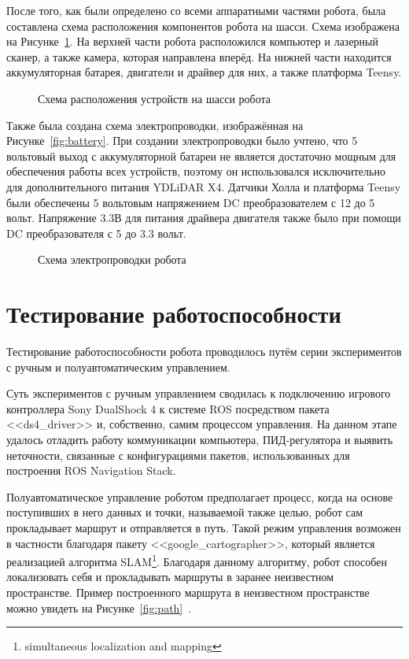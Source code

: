 После того, как были определено со всеми аппаратными частями робота, была составлена схема расположения компонентов робота на шасси. Схема изображена на Рисунке~\cref{fig:devices}. На верхней части робота расположился компьютер и лазерный сканер, а также камера, которая направлена вперёд. На нижней части находится аккумуляторная батарея, двигатели и драйвер для них, а также платформа Teensy.

\begin{figure}[ht]
    \caption{Схема расположения устройств на шасси робота}\label{fig:devices}
\end{figure}

Также была создана схема электропроводки, изображённая на Рисунке~\cref{fig:battery}. При создании электропроводки было учтено, что 5 вольтовый выход с аккумуляторной батареи не является достаточно мощным для обеспечения работы всех устройств, поэтому он использовался исключительно для дополнительного питания YDLiDAR X4. Датчики Холла и платформа Teensy были обеспечены 5 вольтовым напряжением DC преобразователем с 12 до 5 вольт. Напряжение 3.3В для питания драйвера двигателя также было при помощи DC преобразователя с 5 до 3.3 вольт.

\begin{figure}[ht]
    \caption{Схема электропроводки робота}\label{fig:wires}
\end{figure}

\section{Тестирование работоспособности} 

Тестирование работоспособности робота проводилось путём серии экспериментов с ручным и полуавтоматическим управлением.

Суть экспериментов с ручным управлением сводилась к подключению игрового контроллера Sony DualShock 4 к системе ROS посредством пакета <<ds4\_driver>> и, собственно, самим процессом управления. На данном этапе удалось отладить работу коммуникации компьютера, ПИД-регулятора и выявить неточности, связанные с конфигурациями пакетов, использованных для построения ROS Navigation Stack.

Полуавтоматическое управление роботом предполагает процесс, когда на основе поступивших в него данных и точки, называемой также целью, робот сам прокладывает маршрут и отправляется в путь. Такой режим управления возможен в частности благодаря пакету <<google\_cartographer>>, который является реализацией алгоритма SLAM\footnote{simultaneous localization and mapping}. Благодаря данному алгоритму, робот способен локализовать себя и прокладывать маршруты в заранее неизвестном пространстве. Пример построенного маршрута в неизвестном пространстве можно увидеть на Рисунке~\cref{fig:path}~\cite{path}. 

